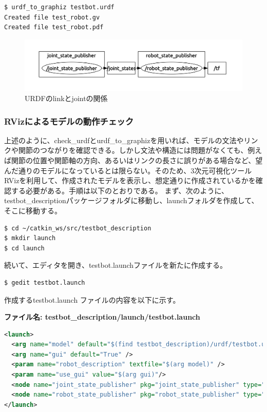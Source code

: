 \begin{lstlisting}[language=ROS]
$ urdf_to_graphiz testbot.urdf
Created file test_robot.gv
Created file test_robot.pdf
\end{lstlisting}

\begin{figure}[ht]
  \centering
  \includegraphics[width=\columnwidth]{pictures/chapter11/pic_11_06.png}
  \caption{URDFのlinkとjointの関係}
\end{figure}

\subsubsection{RVizによるモデルの動作チェック}

上述のように、check\_urdfとurdf\_to\_graphizを用いれば、モデルの文法やリンクや関節のつながりを確認できる。しかし文法や構造には問題がなくても、例えば関節の位置や関節軸の方向、あるいはリンクの長さに誤りがある場合など、望んだ通りのモデルになっているとは限らない。そのため、3次元可視化ツールRVizを利用して、作成されたモデルを表示し、想定通りに作成されているかを確認する必要がある。手順は以下のとおりである。
まず、次のように、testbot\_descriptionパッケージフォルダに移動し、launchフォルダを作成して、そこに移動する。

\begin{lstlisting}[language=ROS]
$ cd ~/catkin_ws/src/testbot_description
$ mkdir launch
$ cd launch
\end{lstlisting}

続いて、エディタを開き、testbot.launchファイルを新たに作成する。

\begin{lstlisting}[language=ROS]
$ gedit testbot.launch
\end{lstlisting}

作成するtestbot.launch ファイルの内容を以下に示す。

\textbf{ファイル名: testbot\_description/launch/testbot.launch}

\begin{lstlisting}[language=XML]
<launch>
  <arg name="model" default="$(find testbot_description)/urdf/testbot.urdf" />
  <arg name="gui" default="True" />
  <param name="robot_description" textfile="$(arg model)" />
  <param name="use_gui" value="$(arg gui)"/>
  <node name="joint_state_publisher" pkg="joint_state_publisher" type="joint_state_publisher" />
  <node name="robot_state_publisher" pkg="robot_state_publisher" type="state_publisher" />
</launch>
\end{lstlisting}

